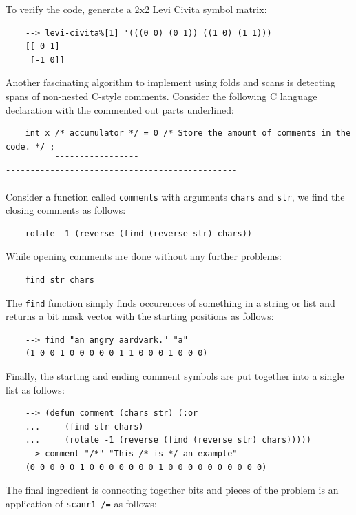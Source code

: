 To verify the code, generate a 2x2 Levi Civita symbol matrix:

\begin{Verbatim}
    --> levi-civita%[1] '(((0 0) (0 1)) ((1 0) (1 1)))
    [[ 0 1]
     [-1 0]]
\end{Verbatim}

Another fascinating algorithm to implement using folds and scans is detecting spans of non-nested C-style comments. Consider the following C language declaration with the commented out parts underlined:

\begin{Verbatim}
    int x /* accumulator */ = 0 /* Store the amount of comments in the code. */ ;
          ¯¯¯¯¯¯¯¯¯¯¯¯¯¯¯¯¯     ¯¯¯¯¯¯¯¯¯¯¯¯¯¯¯¯¯¯¯¯¯¯¯¯¯¯¯¯¯¯¯¯¯¯¯¯¯¯¯¯¯¯¯¯¯¯¯
\end{Verbatim}

Consider a function called \verb|comments| with arguments \verb|chars| and \verb|str|, we find the closing comments as follows:

\begin{Verbatim}
    rotate -1 (reverse (find (reverse str) chars))
\end{Verbatim}

While opening comments are done without any further problems:

\begin{Verbatim}
    find str chars
\end{Verbatim}

The \verb|find| function simply finds occurences of something in a string or list and returns a bit mask vector with the starting positions as follows:

\begin{Verbatim}
    --> find "an angry aardvark." "a"
    (1 0 0 1 0 0 0 0 0 1 1 0 0 0 1 0 0 0)
\end{Verbatim}

Finally, the starting and ending comment symbols are put together into a single list as follows:

\begin{Verbatim}
    --> (defun comment (chars str) (:or
    ...     (find str chars)
    ...     (rotate -1 (reverse (find (reverse str) chars)))))
    --> comment "/*" "This /* is */ an example"
    (0 0 0 0 0 1 0 0 0 0 0 0 0 1 0 0 0 0 0 0 0 0 0 0)
\end{Verbatim}

The final ingredient is connecting together bits and pieces of the problem is an application of \verb|scanr1 /=| as follows:

